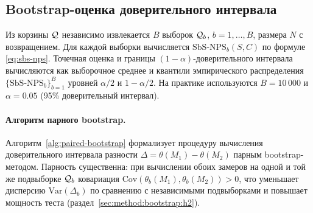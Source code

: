 \subsection{Bootstrap-оценка доверительного интервала}
\label{sec:method:bootstrap:ci}

Из корзины $\mathcal{Q}$ независимо извлекается $B$ выборок $\mathcal{Q}_b$,
$b = 1, \dots, B$, размера $N$ с возвращением.
Для каждой выборки вычисляется $\mathrm{SbS\text{-}NPS}_b(S, C)$ по
формуле \eqref{eq:sbs-nps}.
Точечная оценка и границы $(1-\alpha)$-доверительного интервала
вычисляются как выборочное среднее и квантили эмпирического
распределения $\{\mathrm{SbS\text{-}NPS}_b\}_{b=1}^{B}$ уровней
$\alpha/2$ и $1 - \alpha/2$.
На практике используются $B = 10\,000$ и $\alpha = 0.05$ (95\%
доверительный интервал).

\paragraph{Алгоритм парного bootstrap.}
Алгоритм~\ref{alg:paired-bootstrap} формализует процедуру вычисления
доверительного интервала разности $\Delta = \theta(M_1) - \theta(M_2)$
парным bootstrap-методом.
Парность существенна: при вычислении обоих замеров на одной и той же
подвыборке $\mathcal{Q}_b$ ковариация $\mathrm{Cov}(\theta_b(M_1),
\theta_b(M_2)) > 0$, что уменьшает дисперсию $\mathrm{Var}(\Delta_b)$
по сравнению с независимыми подвыборками и повышает мощность теста
(раздел~\ref{sec:method:bootstrap:h2}).

